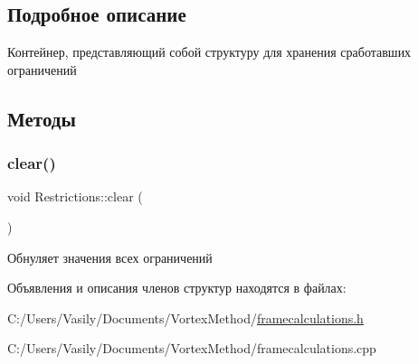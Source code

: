 \subsection{Подробное описание}
Контейнер, представляющий собой структуру для хранения сработавших ограничений 

\subsection{Методы}
\mbox{\label{struct_restrictions_a61c2ebef361f0348d78d67e2a5b342fa}} 
\subsubsection{\texorpdfstring{clear()}{clear()}}
{\footnotesize\ttfamily void Restrictions\+::clear (\begin{DoxyParamCaption}{ }\end{DoxyParamCaption})}

Обнуляет значения всех ограничений 

Объявления и описания членов структур находятся в файлах\+:\begin{DoxyCompactItemize}
\item 
C\+:/\+Users/\+Vasily/\+Documents/\+Vortex\+Method/\mbox{\hyperlink{framecalculations_8h}{framecalculations.\+h}}\item 
C\+:/\+Users/\+Vasily/\+Documents/\+Vortex\+Method/framecalculations.\+cpp\end{DoxyCompactItemize}
